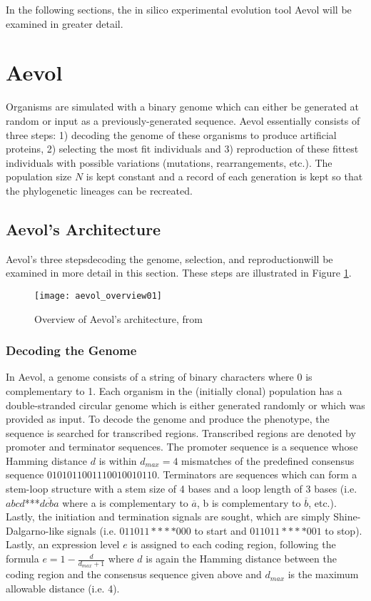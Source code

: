 In the following sections, the in silico experimental evolution tool Aevol will be examined in greater detail. 

\section{Aevol}
Organisms are simulated with a binary genome which can either be generated at random or input as a previously-generated sequence. Aevol essentially consists of three steps: 1) decoding the genome of these organisms to produce artificial proteins, 2) selecting the most fit individuals and 3) reproduction of these fittest individuals with possible variations (mutations, rearrangements, etc.). The population size $N$ is kept constant and a record of each generation is kept so that the phylogenetic lineages can be recreated.

\subsection{Aevol's Architecture}
Aevol's three steps\textemdash decoding the genome, selection, and reproduction\textemdash will be examined in more detail in this section. These steps are illustrated in Figure \ref{fig:aevol_overview01}. 

\begin{figure}[H]\label{fig:aevol_overview01}
	\texttt{[image: aevol\_overview01]}
	\centering
	\caption[Overview of Aevol's architecture.]{Overview of Aevol's architecture, from \cite{Batut.2013}}
\end{figure}
\subsubsection{Decoding the Genome}
In Aevol, a genome consists of a string of binary characters where 0 is complementary to 1. Each organism in the (initially clonal) population has a double-stranded circular genome which is either generated randomly or which was provided as input. To decode the genome and produce the phenotype, the sequence is searched for transcribed regions. Transcribed regions are denoted by promoter and terminator sequences. The promoter sequence is a sequence whose Hamming distance $d$ is within $d_{max} = 4$ mismatches of the predefined consensus sequence $0101011001110010010110$. Terminators are sequences which can form a stem-loop structure with a stem size of 4 bases and a loop length of 3 bases (i.e. $abcd$***$\overline{dcba}$ where a is complementary to $\overline{a}$, b is complementary to $\overline{b}$, etc.). Lastly, the initiation and termination signals are sought, which are simply Shine-Dalgarno-like signals (i.e. $011011****000$ to start and $011011****001$ to stop). Lastly, an expression level $e$ is assigned to each coding region, following the formula $e = 1 - \frac{d}{d_{max} + 1}$ where $d$ is again the Hamming distance between the coding region and the consensus sequence given above and $d_{max}$ is the maximum allowable distance (i.e. 4). 

